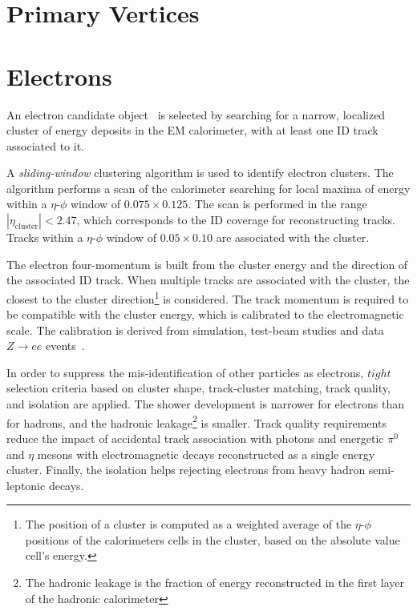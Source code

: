 \section{Primary Vertices}
\label{sec:pv}


\section{Electrons}
\label{sec:electrons}

An electron candidate object~\cite{elereco} is selected by searching 
for a narrow, 
localized cluster of energy deposits in the EM calorimeter, 
with at least one ID track associated to it.

A {\it sliding-window} clustering algorithm is used to identify electron 
clusters. The algorithm performs a scan of the calorimeter searching 
for local maxima of energy
within a $\eta$-$\phi$ window of $0.075\times{}0.125$.
The scan is performed in the range $|\eta_{\mathrm{cluster}}|<2.47$, 
which corresponds to the ID coverage for reconstructing tracks. 
Tracks within a $\eta$-$\phi$ window of $0.05\times{}0.10$ are 
associated with the cluster.

The electron four-momentum is built from the cluster energy
and the direction of the associated ID track.
When multiple tracks are associated with the cluster, the closest
to the cluster direction\footnote{The position of a cluster 
is computed as a weighted average of the $\eta$-$\phi$ positions 
of the calorimeters cells in the cluster, based on the absolute 
value cell's energy.} is considered.
The track momentum is required to be compatible with the cluster energy,
which is calibrated to the electromagnetic scale. The calibration is
derived from simulation, test-beam studies and data $Z\to ee$ 
events~\cite{elecalib}.

In order to suppress the mis-identification of other particles  
as electrons, $tight$ selection criteria based on cluster shape, 
track-cluster matching, track quality, and isolation are applied.
The shower development is narrower for electrons than for hadrons, and
the hadronic leakage\footnote{The hadronic leakage is the fraction of 
energy reconstructed in the first layer of the hadronic calorimeter}
is smaller. Track quality requirements reduce the impact of accidental 
track association with photons and energetic $\pi^0$ and $\eta$ mesons
with electromagnetic decays reconstructed as a single energy cluster.
Finally, the isolation helps rejecting electrons from heavy hadron 
semi-leptonic decays.

